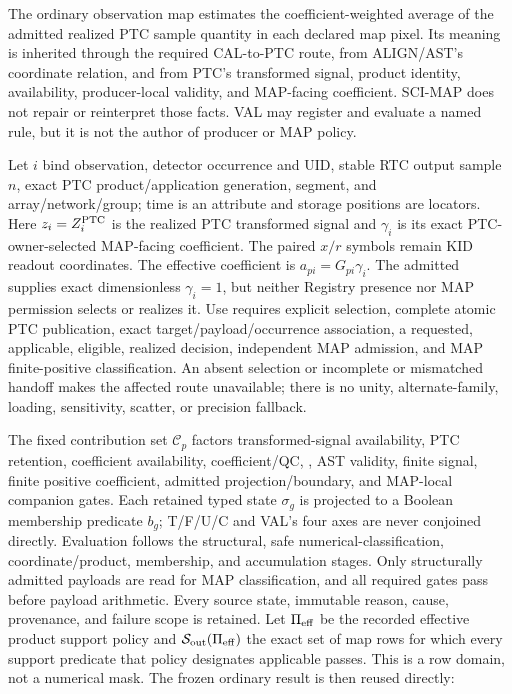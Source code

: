 \documentclass[10pt]{article}
\begin{document}
The ordinary observation map estimates the coefficient-weighted average of
the admitted realized PTC sample quantity in each declared map pixel. Its
meaning is inherited through the required CAL-to-PTC route, from ALIGN/AST's
coordinate relation, and from PTC's transformed signal, product identity,
availability, producer-local validity, and MAP-facing coefficient. SCI-MAP
does not repair or reinterpret those facts. VAL may register and evaluate a
named rule, but it is not the author of producer or MAP policy.

Let \(i\) bind observation, detector occurrence and UID, stable RTC output
sample \(n\), exact PTC product/application generation, segment, and
array/network/group; time is an attribute and storage positions are locators.
Here \(z_i=Z_i^{\rm PTC}\) is the realized PTC transformed signal and
\(\gamma_i\) is its exact PTC-owner-selected MAP-facing coefficient. The
paired \(x/r\) symbols remain KID readout coordinates. The effective
coefficient is \(a_{pi}=G_{pi}\gamma_i\). The admitted
\SCIMapPTCUniformFamily{} supplies exact dimensionless \(\gamma_i=1\), but
neither Registry presence nor MAP permission selects or realizes it. Use
requires explicit selection, complete atomic PTC publication, exact
target/payload/occurrence association, a requested, applicable, eligible,
realized \SCIMapPTCUniformHandoffProfile{} decision, independent MAP admission,
and MAP finite-positive classification. An absent selection or incomplete or
mismatched handoff makes the affected route unavailable; there is no unity,
alternate-family, loading, sensitivity, scatter, or precision fallback.

The fixed contribution set \(\mathcal C_p\) factors transformed-signal
availability, PTC retention, coefficient availability, coefficient/QC,
\SCIMapUpstreamProfile, AST validity, finite signal, finite
positive coefficient, admitted projection/boundary, and MAP-local companion
gates. Each retained typed state \(\sigma_g\) is projected to a Boolean
membership predicate \(b_g\); T/F/U/C and VAL's four axes are never conjoined
directly. Evaluation follows the structural, safe numerical-classification,
coordinate/product, membership, and accumulation stages. Only structurally
admitted payloads are read for MAP classification, and all required gates
pass before payload arithmetic. Every source state, immutable reason, cause,
provenance, and failure scope is retained.
Let \(\Pi_{\rm eff}\) be the recorded effective product
support policy and \(\mathcal S_{\rm out}(\Pi_{\rm eff})\) the exact set of map
rows for which every support predicate that policy designates applicable
passes. This is a row domain, not a numerical mask. The frozen ordinary result
is then reused directly:
\end{document}
